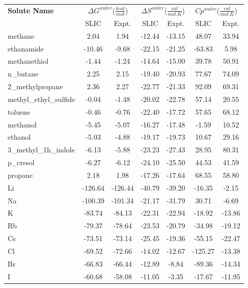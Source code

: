 \documentclass{amsart}
\begin{document}
 
\begin{tabular}{l|C|C|C|C|C|C} 
\centering 
\textbf{Solute Name}  &     &    &    \\ 
& SLIC & Expt. & SLIC & Expt. & SLIC & Expt. \\ 
\hline 
methane & 2.04 & 1.94 & -12.44 & -13.15 & 48.07 & 33.94 \\ 
ethanamide & -10.46 & -9.68 & -22.15 & -21.25 & -63.83 & 5.98 \\ 
methanethiol & -1.44 & -1.24 & -14.64 & -15.00 & 39.78 & 50.91 \\ 
n\_butane & 2.25 & 2.15 & -19.40 & -20.93 & 77.67 & 74.09 \\ 
2\_methylpropane & 2.36 & 2.27 & -22.77 & -21.33 & 92.09 & 69.31 \\ 
methyl\_ethyl\_sulfide & -0.04 & -1.48 & -20.02 & -22.78 & 57.14 & 20.55 \\ 
toluene & -0.46 & -0.76 & -22.40 & -17.72 & 57.65 & 68.12 \\ 
methanol & -5.45 & -5.07 & -16.27 & -17.48 & -1.59 & 10.52 \\ 
ethanol & -5.03 & -4.88 & -19.17 & -19.73 & 10.67 & 29.16 \\ 
3\_methyl\_1h\_indole & -6.13 & -5.88 & -23.23 & -27.43 & 28.95 & 80.31 \\ 
p\_cresol & -6.27 & -6.12 & -24.10 & -25.50 & 44.53 & 41.59 \\ 
propane & 2.18 & 1.98 & -17.26 & -17.64 & 68.55 & 58.80 \\ 
Li & -126.64 & -126.44 & -40.79 & -39.20 & -16.35 & -2.15 \\ 
Na & -100.39 & -101.34 & -21.17 & -31.79 & 30.71 & -6.69 \\ 
K & -83.74 & -84.13 & -22.31 & -22.94 & -18.92 & -13.86 \\ 
Rb & -79.37 & -78.64 & -23.53 & -20.79 & -34.98 & -19.12 \\ 
Cs & -73.51 & -73.14 & -25.45 & -19.36 & -55.15 & -22.47 \\ 
Cl & -69.52 & -72.66 & -14.02 & -12.67 & -125.27 & -13.38 \\ 
Br & -66.83 & -66.44 & -12.89 & -8.84 & -89.36 & -14.34 \\ 
I & -60.68 & -58.08 & -11.05 & -3.35 & -17.67 & -11.95 \\ 
\end{tabular} 
\end{document}
